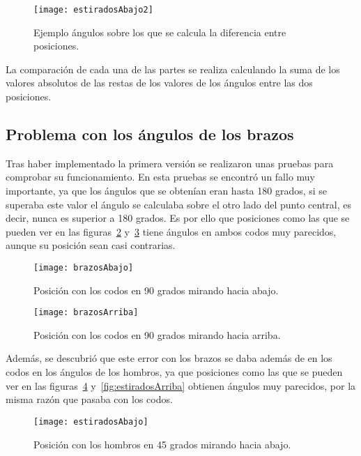 {\begin{figure}[h]
	\centering
	\texttt{[image: estiradosAbajo2]}
	\caption{Ejemplo ángulos sobre los que se calcula la diferencia entre posiciones.}
	\label{fig:estiradosAbajo2}
\end{figure}

La comparación de cada una de las partes se realiza calculando la suma de los valores absolutos de las restas de los valores de los ángulos entre las dos posiciones.

\subsection{Problema con los ángulos de los brazos}
Tras haber implementado la primera versión se realizaron unas pruebas para comprobar su funcionamiento. En esta pruebas se encontró un fallo muy importante, ya que los ángulos que se obtenían eran hasta 180 grados, si se superaba este valor el ángulo se calculaba sobre el otro lado del punto central, es decir, nunca es superior a 180 grados. Es por ello que  posiciones como las que se pueden ver en las figuras~\ref{fig:brazosAbajo} y~\ref{fig:brazosArriba} tiene ángulos en ambos codos muy parecidos, aunque su posición sean casi contrarias.

\begin{figure}[h]
	\centering
	\texttt{[image: brazosAbajo]}
	\caption{Posición con los codos en 90 grados mirando hacia abajo.}
	\label{fig:brazosAbajo}
\end{figure}

\begin{figure}[h]
	\centering
	\texttt{[image: brazosArriba]}
	\caption{Posición con los codos en 90 grados mirando hacia arriba.}
	\label{fig:brazosArriba}
\end{figure}

Además, se descubrió que este error con los brazos se daba además de en los codos en los ángulos de los hombros, ya que posiciones como las que se pueden ver en las figuras~\ref{fig:estiradosAbajo} y~\ref{fig:estiradosArriba} obtienen ángulos muy parecidos, por la misma razón que pasaba con los codos.

\begin{figure}[h]
	\centering
	\texttt{[image: estiradosAbajo]}
	\caption{Posición con los hombros en 45 grados mirando hacia abajo.}
	\label{fig:estiradosAbajo}
\end{figure}

}
